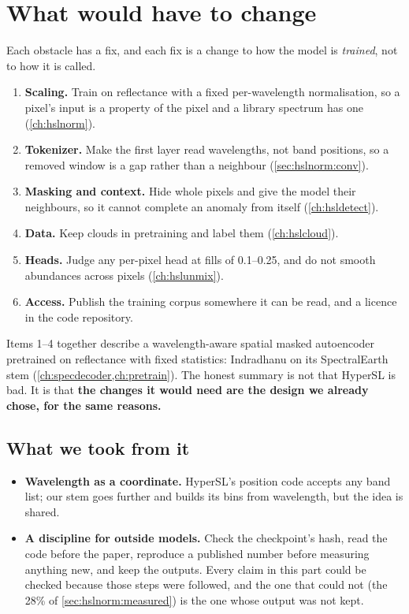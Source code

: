\section{What would have to change}\label{sec:hslverdict:change}

Each obstacle has a fix, and each fix is a change to how the model is \emph{trained}, not to how it is called.
\begin{enumerate}
\item \textbf{Scaling.} Train on reflectance with a fixed per-wavelength normalisation, so a pixel's input is a property of
the pixel and a library spectrum has one (\cref{ch:hslnorm}).
\item \textbf{Tokenizer.} Make the first layer read wavelengths, not band positions, so a removed window is a gap rather
than a neighbour (\cref{sec:hslnorm:conv}).
\item \textbf{Masking and context.} Hide whole pixels and give the model their neighbours, so it cannot complete an anomaly
from itself (\cref{ch:hsldetect}).
\item \textbf{Data.} Keep clouds in pretraining and label them (\cref{ch:hslcloud}).
\item \textbf{Heads.} Judge any per-pixel head at fills of 0.1--0.25, and do not smooth abundances across pixels
(\cref{ch:hslunmix}).
\item \textbf{Access.} Publish the training corpus somewhere it can be read, and a licence in the code repository.
\end{enumerate}
Items 1--4 together describe a wavelength-aware spatial masked autoencoder pretrained on reflectance with fixed
statistics: Indradhanu on its SpectralEarth stem (\cref{ch:specdecoder,ch:pretrain}). The honest summary is not that
HyperSL is bad. It is that \textbf{the changes it would need are the design we already chose, for the same reasons.}

\subsection{What we took from it}

\begin{itemize}
\item \textbf{Wavelength as a coordinate.} HyperSL's position code accepts any band list; our stem goes further and builds
its bins from wavelength, but the idea is shared.
\item \textbf{A discipline for outside models.} Check the checkpoint's hash, read the code before the paper, reproduce a
published number before measuring anything new, and keep the outputs. Every claim in this part could be checked because
those steps were followed, and the one that could not (the 28\% of \cref{sec:hslnorm:measured}) is the one whose output
was not kept.
\end{itemize}

